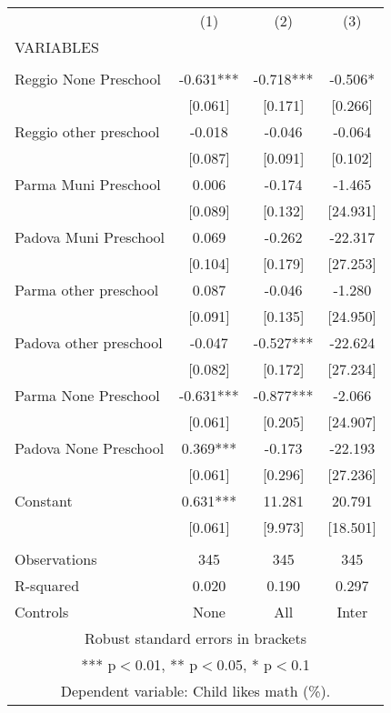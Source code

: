 \begin{tabular}{lccc} \hline
 & (1) & (2) & (3) \\
VARIABLES &  &  &  \\ \hline
 &  &  &  \\
Reggio None Preschool & -0.631*** & -0.718*** & -0.506* \\
 & [0.061] & [0.171] & [0.266] \\
Reggio other preschool & -0.018 & -0.046 & -0.064 \\
 & [0.087] & [0.091] & [0.102] \\
Parma Muni Preschool & 0.006 & -0.174 & -1.465 \\
 & [0.089] & [0.132] & [24.931] \\
Padova Muni Preschool & 0.069 & -0.262 & -22.317 \\
 & [0.104] & [0.179] & [27.253] \\
Parma other preschool & 0.087 & -0.046 & -1.280 \\
 & [0.091] & [0.135] & [24.950] \\
Padova other preschool & -0.047 & -0.527*** & -22.624 \\
 & [0.082] & [0.172] & [27.234] \\
Parma None Preschool & -0.631*** & -0.877*** & -2.066 \\
 & [0.061] & [0.205] & [24.907] \\
Padova None Preschool & 0.369*** & -0.173 & -22.193 \\
 & [0.061] & [0.296] & [27.236] \\
Constant & 0.631*** & 11.281 & 20.791 \\
 & [0.061] & [9.973] & [18.501] \\
 &  &  &  \\
Observations & 345 & 345 & 345 \\
R-squared & 0.020 & 0.190 & 0.297 \\
 Controls & None & All & Inter \\ \hline
\multicolumn{4}{c}{ Robust standard errors in brackets} \\
\multicolumn{4}{c}{ *** p$<$0.01, ** p$<$0.05, * p$<$0.1} \\
\multicolumn{4}{c}{ Dependent variable: Child likes math (\%).} \\
\end{tabular}
